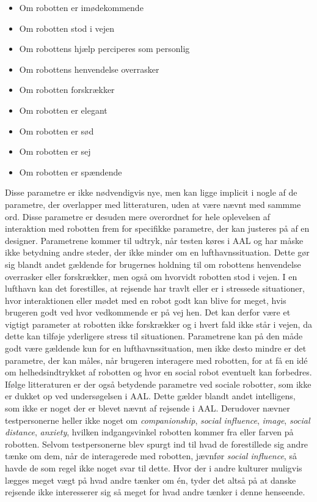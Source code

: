 \begin{multicols}{2}
	\begin{itemize}
		\item Om robotten er imødekommende
		\item Om robotten stod i vejen
		\item Om robottens hjælp perciperes som personlig
		\item Om robottens henvendelse overrasker
		\item Om robotten forskrækker
		\item Om robotten er elegant
		\item Om robotten er sød
		\item Om robotten er sej
		\item Om robotten er spændende
	\end{itemize}
\end{multicols}
\noindent
%
Disse parametre er ikke nødvendigvis nye, men kan ligge implicit i nogle af de parametre, der overlapper med litteraturen, uden at være nævnt med sammme ord. Disse parametre er desuden mere overordnet for hele oplevelsen af interaktion med robotten frem for specifikke parametre, der kan justeres på af en designer. Parametrene kommer til udtryk, når testen køres i AAL og har måske ikke betydning andre steder, der ikke minder om en lufthavnssituation. Dette gør sig blandt andet gældende for brugernes holdning til om robottens henvendelse overrasker eller forskrækker, men også om hvorvidt robotten stod i vejen. I en lufthavn kan det forestilles, at rejsende har travlt eller er i stressede situationer, hvor interaktionen eller mødet med en robot godt kan blive for meget, hvis brugeren godt ved hvor vedkommende er på vej hen. Det kan derfor være et vigtigt parameter at robotten ikke forskrækker og i hvert fald ikke står i vejen, da dette kan tilføje yderligere stress til situationen. Parametrene kan på den måde godt være gældende kun for en lufthavnssituation, men ikke desto mindre er det parametre, der kan måles, når brugeren interagere med robotten, for at få en idé om helhedsindtrykket af robotten og hvor en social robot eventuelt kan forbedres. \blankline
%
Ifølge litteraturen er der også betydende parametre ved sociale robotter, som ikke er dukket op ved undersøgelsen i AAL. Dette gælder blandt andet intelligens, som ikke er noget der er blevet nævnt af rejsende i AAL. Derudover nævner testpersonerne heller ikke noget om \textit{companionship}, \textit{social influence}, \textit{image}, \textit{social distance}, \textit{anxiety}, hvilken indgangsvinkel robotten kommer fra eller farven på robotten. Selvom testpersonerne blev spurgt ind til hvad de forestillede sig andre tænke om dem, når de interagerede med robotten, jævnfør \textit{social influence}, så havde de som regel ikke noget svar til dette. Hvor der i andre kulturer muligvis lægges meget vægt på hvad andre tænker om én, tyder det altså på at danske rejsende ikke interesserer sig så meget for hvad andre tænker i denne henseende. \blankline
